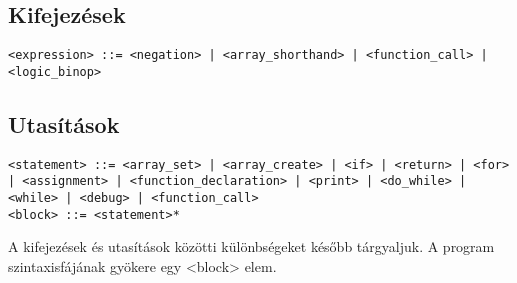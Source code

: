 \subsection{Kifejezések}

\begin{footnotesize}
\begin{verbatim}
<expression> ::= <negation> | <array_shorthand> | <function_call> | <logic_binop>
\end{verbatim}
\end{footnotesize}

\subsection{Utasítások}

\begin{footnotesize}
\begin{verbatim}
<statement> ::= <array_set> | <array_create> | <if> | <return> | <for> | <assignment> | <function_declaration> | <print> | <do_while> | <while> | <debug> | <function_call>
<block> ::= <statement>*
\end{verbatim}
\end{footnotesize}

A kifejezések és utasítások közötti különbségeket később tárgyaljuk. A program szintaxisfájának gyökere egy <block> elem.